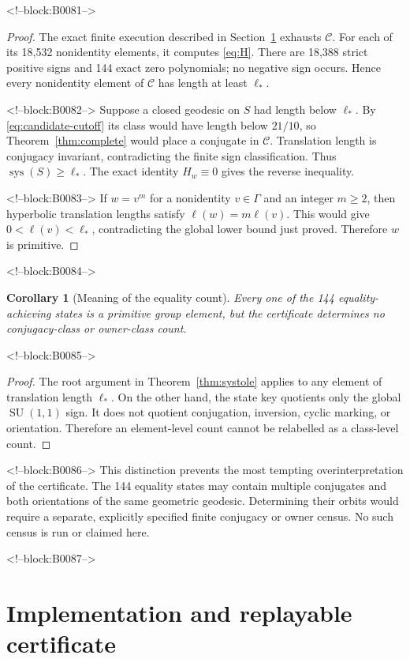 \documentclass[11pt,a4paper]{article}
\newtheorem{corollary}[theorem]{Corollary}
\theoremstyle{definition}
\newcommand{\SU}{\operatorname{SU}}
\newcommand{\sys}{\operatorname{sys}}
\newcommand{\length}{\ell}
\begin{document}
<!--block:B0081-->
\begin{proof}
The exact finite execution described in Section~\ref{sec:implementation}
exhausts \(\mathcal C\).  For each of its 18,532 nonidentity elements, it
computes \eqref{eq:H}.  There are 18,388 strict positive signs and 144 exact
zero polynomials; no negative sign occurs.  Hence every nonidentity element
of \(\mathcal C\) has length at least \(\length_*\).

<!--block:B0082-->
Suppose a closed geodesic on \(S\) had length below \(\length_*\).  By
\eqref{eq:candidate-cutoff} its class would have length below \(21/10\), so
Theorem~\ref{thm:complete} would place a conjugate in \(\mathcal C\).
Translation length is conjugacy invariant, contradicting the finite sign
classification.  Thus \(\sys(S)\geq\length_*\).  The exact identity
\(H_w\equiv0\) gives the reverse inequality.

<!--block:B0083-->
If \(w=v^m\) for a nonidentity \(v\in\Gamma\) and an integer \(m\geq2\), then
hyperbolic translation lengths satisfy
\(\length(w)=m\length(v)\).  This would give
\(0<\length(v)<\length_*\), contradicting the global lower bound just proved.
Therefore \(w\) is primitive.
\end{proof}

<!--block:B0084-->
\begin{corollary}[Meaning of the equality count]
Every one of the 144 equality-achieving states is a primitive group element,
but the certificate determines no conjugacy-class or owner-class count.
\end{corollary}

<!--block:B0085-->
\begin{proof}
The root argument in Theorem~\ref{thm:systole} applies to any element of
translation length \(\length_*\).  On the other hand, the state key quotients
only the global \(\SU(1,1)\) sign.  It does not quotient conjugation, inversion,
cyclic marking, or orientation.  Therefore an element-level count cannot be
relabelled as a class-level count.
\end{proof}

<!--block:B0086-->
This distinction prevents the most tempting overinterpretation of the
certificate.  The 144 equality states may contain multiple conjugates and
both orientations of the same geometric geodesic.  Determining their orbits
would require a separate, explicitly specified finite conjugacy or owner
census.  No such census is run or claimed here.

<!--block:B0087-->
\section{Implementation and replayable certificate}
\label{sec:implementation}
\end{document}
